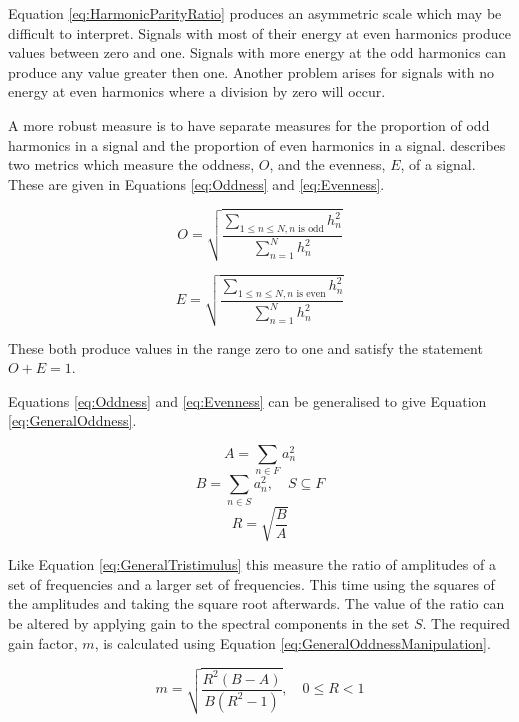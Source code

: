 		Equation \ref{eq:HarmonicParityRatio} produces an asymmetric scale which may be difficult to interpret.
		Signals with most of their energy at even harmonics produce values between zero and one. Signals with more
		energy at the odd harmonics can produce any value greater then one. Another problem arises for signals with
		no energy at even harmonics where a division by zero will occur.

		A more robust measure is to have separate measures for the proportion of odd harmonics in a signal and the
		proportion of even harmonics in a signal.  \citet{lukasik2005towards} describes two metrics which measure
		the oddness, $O$, and the evenness, $E$, of a signal. These are given in Equations \ref{eq:Oddness} and
		\ref{eq:Evenness}.

		\begin{equation}
			O = \sqrt{\frac{\sum_{1 \leq n \leq N, n \textrm{ is odd}} h_{n}^{2}}
			               {\sum_{n = 1}^{N} h_{n}^{2}}}
			\label{eq:Oddness}
		\end{equation}

		\begin{equation}
			E = \sqrt{\frac{\sum_{1 \leq n \leq N, n \textrm{ is even}} h_{n}^{2}}
			               {\sum_{n = 1}^{N} h_{n}^{2}}}
			\label{eq:Evenness}
		\end{equation}

		These both produce values in the range zero to one and satisfy the statement $O + E = 1$. 

		Equations \ref{eq:Oddness} and \ref{eq:Evenness} can be generalised to give Equation
		\ref{eq:GeneralOddness}.

		\[ A = \sum_{n \in F} a_{n}^{2} \]
		\[ B = \sum_{n \in S} a_{n}^{2}, \quad S \subseteq F \]
		\begin{equation}
			R = \sqrt{\frac{B}{A}}
			\label{eq:GeneralOddness}
		\end{equation}

		Like Equation \ref{eq:GeneralTristimulus} this measure the ratio of amplitudes of a set of frequencies and
		a larger set of frequencies. This time using the squares of the amplitudes and taking the square root
		afterwards. The value of the ratio can be altered by applying gain to the spectral components in the set
		$S$. The required gain factor, $m$, is calculated using Equation \ref{eq:GeneralOddnessManipulation}.

		\begin{equation}
			m = \sqrt{\frac{R^{2}(B - A)}{B(R^{2} - 1)}}, \quad 0 \leq R < 1
			\label{eq:GeneralOddnessManipulation}
		\end{equation}

